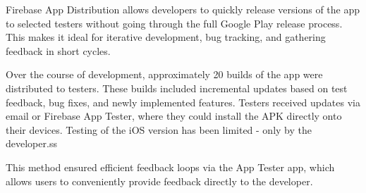 \documentclass[
  digital,     %
  oneside,     %
  nosansbold,  %
  nocolorbold, %
  lof,         %
  lot,         %
]{fithesis4}
\begin{document}
\begin{markdown}
Firebase App Distribution allows developers to quickly release versions of the app to selected testers without going through the full Google Play release process. This makes it ideal for iterative development, bug tracking, and gathering feedback in short cycles.

Over the course of development, approximately 20 builds of the app were distributed to testers. These builds included incremental updates based on test feedback, bug fixes, and newly implemented features. Testers received updates via email or Firebase App Tester, where they could install the APK directly onto their devices. Testing of the iOS version has been limited - only by the developer.ss

This method ensured efficient feedback loops via the App Tester app, which allows users to conveniently provide feedback directly to the developer.

\end{markdown}
\shorthandon{-}
\end{document}
